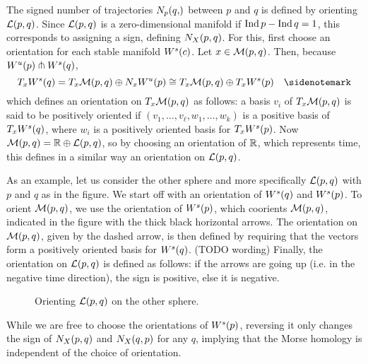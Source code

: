     The signed number of trajectories $\NX pq$ between $p$ and $q$ is defined by orienting  $\mathcal L(p, q)$. Since  $\mathcal L(p, q)$ is a zero-dimensional manifold if  $\operatorname{Ind} p - \operatorname{Ind} q = 1$, this corresponds to assigning a sign, defining  $N_{X}(p, q)$.
    For this, first choose an orientation for each stable manifold $W^s(c)$.
    Let $x \in \mathcal M(p, q)$.
    Then, because $W^u(p) \pitchfork W^s(q)$,
    \[
    T_x \stable q = T_x \traj pq \oplus N_x \unstable p  \cong
    T_x \traj pq \oplus T_x \stable p \quad \sidenotemark    \] 
    which defines an orientation on $T_x \mathcal M(p, q)$ as follows: a basis $v_i$ of $T_x \mathcal M(p, q) $ is said to be positively oriented if $(v_1, \ldots, v_\ell, w_1, \ldots, w_k)$ is a positive basis of  $T_x W^s(q)$, where $w_i$ is a positively oriented basis for $T_x W^s(p)$.
    Now $\mathcal M(p, q) = \mathbb{R} \oplus \mathcal L(p, q)$, so by choosing an orientation of $\mathbb{R}$, which represents time, this defines in a similar way an orientation on $\mathcal L(p, q)$.
    \begin{eg}
        As an example, let us consider the other sphere and more specifically $\mathcal L(p, q)$ with $p$ and  $q$ as in the figure. 
        We start off with an orientation of $W^s(q)$ and  $W^s(p)$.
        To orient  $\mathcal M(p, q)$, we use the orientation of  $W^s(p)$, which coorients $\mathcal M(p, q)$, indicated in the figure with the thick black horizontal arrows.
        The orientation on $\mathcal M(p, q)$, given by the dashed arrow, is then defined by requiring that the vectors form a positively oriented basis for $W^s(q)$. (TODO wording)
        Finally, the orientation on $\mathcal L(p, q)$ is defined as follows: if the arrows are going up (i.e. in the negative time direction), the sign is positive, else it is negative.
        \begin{figure}[H]
    \centering
    \caption{
        Orienting $\mathcal L(p, q)$ on the other sphere.
    }
    \label{fig:orientation-example}
\end{figure}
    \end{eg}

    \begin{remark}
        While we are free to choose the orientations of $W^s(p)$, reversing it only changes the sign of $N_{X}(p, q)$ and  $N_{X}(q, p)$ for any $q$, implying that the Morse homology is independent of the choice of orientation.
    \end{remark}

